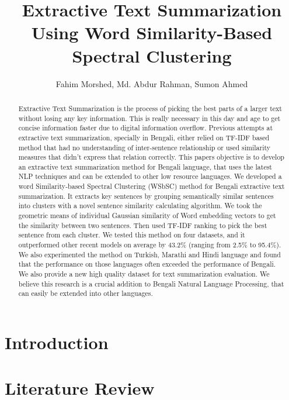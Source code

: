 \documentclass[11pt]{article}
\title{Extractive Text Summarization Using Word Similarity-Based Spectral Clustering}
\author{Fahim Morshed, Md. Abdur Rahman, Sumon Ahmed}
\begin{document}
    \maketitle
    \setlength{\parindent}{0pt}
    \begin{abstract}
        Extractive Text Summarization is the process of picking the best parts of
        a larger text without losing any key information.
        This is really necessary in this day and age to get concise information
        faster due to digital information overflow.
        Previous attempts at extractive text summarization, specially in
        Bengali, either relied on
        TF-IDF based method that had no understanding of inter-sentence relationship
        or used similarity measures that didn't express that relation correctly.
        This papers objective is to develop an extractive text summarization
        method for Bengali language, that uses the latest NLP techniques
        and can be extended to other low resource languages.
        We developed a word Similarity-based Spectral Clustering (WSbSC) method
        for Bengali extractive text summarization.
        It extracts key sentences by grouping semantically similar sentences into clusters
        with a novel sentence similarity calculating algorithm.
        We took the geometric means of individual Gaussian similarity
        of Word embedding vectors to get the similarity between two sentences.
        Then used TF-IDF ranking to pick the best sentence from each cluster.
        We tested this method on four datasets,
        and it outperformed other recent models on average by 43.2\%
        (ranging from 2.5\% to 95.4\%).
        We also experimented the method on Turkish, Marathi and Hindi language and found that the
        performance on those languages often exceeded the performance of Bengali.
        We also provide a new high quality dataset for text summarization evaluation.
        We believe this research is a crucial addition to Bengali Natural Language Processing,
        that can easily be extended into other languages.
    \end{abstract}

    \section{Introduction}\label{sec:introduction}
    

    \section{Literature Review}\label{sec:literature-review}
    
\end{document}

